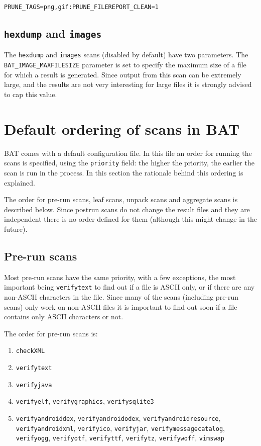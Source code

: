 \documentclass[10pt,a4paper]{article}
\begin{document}
\begin{verbatim}
PRUNE_TAGS=png,gif:PRUNE_FILEREPORT_CLEAN=1
\end{verbatim}

\subsection{\texttt{hexdump} and \texttt{images}}

The \texttt{hexdump} and \texttt{images} scans (disabled by default) have two
parameters. The \texttt{BAT\_IMAGE\_MAXFILESIZE} parameter is set to specify
the maximum size of a file for which a result is generated. Since output from
this scan can be extremely large, and the results are not very interesting for
large files it is strongly advised to cap this value.

\section{Default ordering of scans in BAT}

BAT comes with a default configuration file. In this file an order for running
the scans is specified, using the \texttt{priority} field: the higher the
priority, the earlier the scan is run in the process. In this section the
rationale behind this ordering is explained.

The order for pre-run scans, leaf scans, unpack scans and aggregate scans is
described below. Since postrun scans do not change the result files and they are
independent there is no order defined for them (although this might change in
the future).

\subsection{Pre-run scans}

Most pre-run scans have the same priority, with a few exceptions, the most
important being \texttt{verifytext} to find out if a file is ASCII only, or if
there are any non-ASCII characters in the file. Since many of the scans
(including pre-run scans) only work on non-ASCII files it is important to find
out soon if a file contains only ASCII characters or not.

The order for pre-run scans is:

\begin{enumerate}
\item \texttt{checkXML}
\item \texttt{verifytext}
\item \texttt{verifyjava}
\item \texttt{verifyelf}, \texttt{verifygraphics}, \texttt{verifysqlite3}
\item \texttt{verifyandroiddex}, \texttt{verifyandroidodex},
\texttt{verifyandroidresource}, \texttt{verifyandroidxml}, \texttt{verifyico},
\texttt{verifyjar}, \texttt{verifymessagecatalog}, \texttt{verifyogg},
\texttt{verifyotf}, \texttt{verifyttf}, \texttt{verifytz}, \texttt{verifywoff},
\texttt{vimswap}
\end{enumerate}
\end{document}
